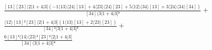 \documentclass[varwidth, border=5pt]{standalone}
\begin{document}
\begin{my}
$\begin{gathered}
\scriptscriptstyle\frac{[13][23]⟨2|1+4|3](-1⟨13⟩⟨24⟩[13]+4⟨23⟩⟨24⟩[23]+5⟨12⟩⟨34⟩[13]+3⟨24⟩⟨34⟩[34])}{[34]⟨3|1+4|3]³} +\\
\scriptscriptstyle\frac{⟨12⟩[13]²[23]⟨2|1+4|3](1⟨13⟩[13]+2⟨23⟩[23])}{[34]²⟨3|1+4|3]³} +\\
\scriptscriptstyle\frac{6[13]²⟨14⟩⟨23⟩²[23]²⟨2|1+4|3]}{[34]⟨3|1+4|3]⁴} \phantom{+}
\end{gathered}$
\end{my}
\end{document}
